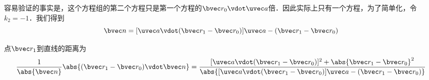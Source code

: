 容易验证的事实是，这个方程组的第二个方程只是第一个方程的$\bvec r_0\vdot\uvec a$倍．因此实际上只有一个方程，为了简单化，令$k_2 = -1$．我们得到
\begin{equation}
\bvec n = [\uvec a \vdot (\bvec r_1 -\bvec r_0)]\uvec a - (\bvec r_1 - \bvec r_0)
\end{equation}

点$\bvec r_1$到直线的距离为
\begin{equation}
\frac{1}{\abs{\bvec n}}\abs{(\bvec r_1 - \bvec r_0) \vdot \bvec n}=\frac{[\uvec a \vdot (\bvec r_1 - \bvec r_0)]^2+\abs{\bvec r_1 - \bvec r_0}^2}{\abs{[\uvec a \vdot (\bvec r_1 - \bvec r_0)]\uvec a - (\bvec r_1 - \bvec r_0)}}
\end{equation}

